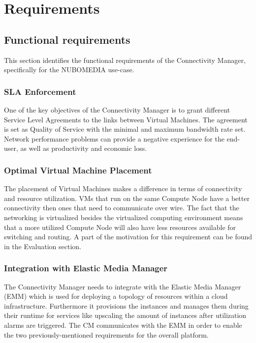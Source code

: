 \chapter{Requirements}

\section{Functional requirements}

This section identifies the functional requirements of the Connectivity Manager, specifically for the NUBOMEDIA use-case.

\subsection{SLA Enforcement}

One of the key objectives of the Connectivity Manager is to grant different Service Level Agreements to the links between Virtual Machines. The agreement is set as Quality of Service with the minimal and maximum bandwidth rate set. Network performance problems can provide a negative experience for the end-user, as well as productivity and economic loss.

\subsection{Optimal Virtual Machine Placement}

The placement of Virtual Machines makes a difference in terms of connectivity and resource utilization. VMs that run on the same Compute Node have a better connectivity then ones that need to communicate over wire. The fact that the networking is virtualized besides the virtualized computing environment means that a more utilized Compute Node will also have less resources available for switching and routing. A part of the motivation for this requirement can be found in the Evaluation section.

\subsection{Integration with Elastic Media Manager}

The Connectivity Manager needs to integrate with the Elastic Media Manager (EMM) which is used for deploying a topology of resources within a cloud infrastructure. Furthermore it provisions the instances and manages them during their runtime for services like upscaling the amount of instances after utilization alarms are triggered. The CM communicates with the EMM in order to enable the two previously-mentioned requirements for the overall platform.

